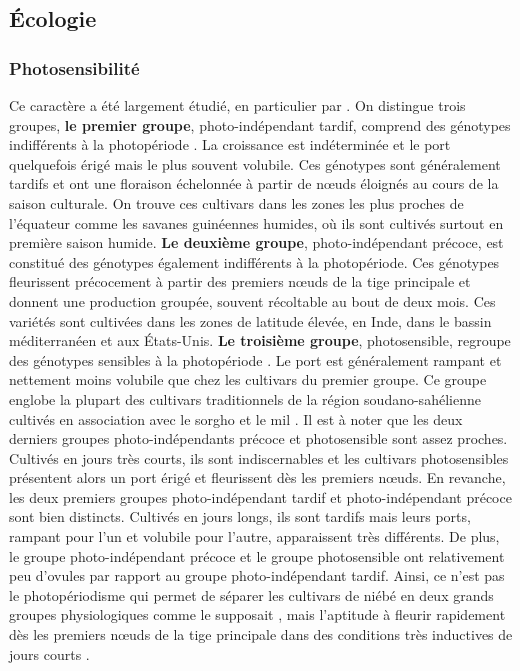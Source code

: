 \documentclass[a4paper,11pt]{article}
\begin{document}
\subsection{Écologie}

\subsubsection{Photosensibilité}

Ce caractère a été largement étudié, en particulier par
\citeauthor{Steele_1972} \citeyear{Steele_1972}. On distingue trois
groupes, \textbf{le premier groupe}, photo-indépendant tardif,
comprend des génotypes indifférents à la photopériode
\cite{IITA_2008}. La croissance est indéterminée et le port
quelquefois érigé mais le plus souvent volubile. Ces génotypes sont
généralement tardifs et ont une floraison échelonnée à partir de nœuds
éloignés au cours de la saison culturale. On trouve ces cultivars dans
les zones les plus proches de l'équateur comme les savanes guinéennes
humides, où ils sont cultivés surtout en première saison
humide. \textbf{Le deuxième groupe}, photo-indépendant précoce, est
constitué des génotypes également indifférents à la photopériode. Ces
génotypes fleurissent précocement à partir des premiers nœuds de la
tige principale et donnent une production groupée, souvent récoltable
au bout de deux mois. Ces variétés sont cultivées dans les zones de
latitude élevée, en Inde, dans le bassin méditerranéen et aux
États-Unis. \textbf{Le troisième groupe}, photosensible, regroupe des
génotypes sensibles à la photopériode \cite{Steele_1972}. Le port est
généralement rampant et nettement moins volubile que chez les
cultivars du premier groupe. Ce groupe englobe la plupart des
cultivars traditionnels de la région soudano-sahélienne cultivés en
association avec le sorgho et le mil \cite{Doggett_1988}. Il est à
noter que les deux derniers groupes photo-indépendants précoce et
photosensible sont assez proches. Cultivés en jours très courts, ils
sont indiscernables et les cultivars photosensibles présentent alors
un port érigé et fleurissent dès les premiers nœuds. En revanche, les
deux premiers groupes photo-indépendant tardif et photo-indépendant
précoce sont bien distincts. Cultivés en jours longs, ils sont tardifs
mais leurs ports, rampant pour l'un et volubile pour l'autre,
apparaissent très différents. De plus, le groupe photo-indépendant
précoce et le groupe photosensible ont relativement peu d'ovules par
rapport au groupe photo-indépendant tardif. Ainsi, ce n'est pas le
photopériodisme qui permet de séparer les cultivars de niébé en deux
grands groupes physiologiques comme le supposait
\citeauthor{Steele_1972} \citeyear{Steele_1972}, mais l'aptitude à
fleurir rapidement dès les premiers nœuds de la tige principale dans
des conditions très inductives de jours courts \cite{IITA_2008}.
\end{document}
